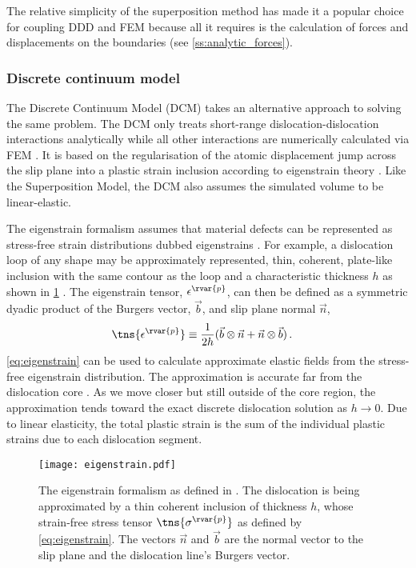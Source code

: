 The relative simplicity of the superposition method has made it a popular choice \cite{analytic_tractions, ddd_fem_sm, ddd_fem_sm2} for coupling DDD and FEM because all it requires is the calculation of forces and displacements on the boundaries (see \cref{ss:analytic_forces}).

\subsubsection{Discrete continuum model}
\label{sss:discrete_continuum}
The Discrete Continuum Model (DCM) takes an alternative approach to solving the same problem. The DCM only treats short-range dislocation-dislocation interactions analytically while all other interactions are numerically calculated via FEM \cite{dcm}. It is based on the regularisation of the atomic displacement jump across the slip plane into a plastic strain inclusion according to eigenstrain theory \cite{eigenstrain}. Like the Superposition Model, the DCM also assumes the simulated volume to be linear-elastic.

The eigenstrain formalism assumes that material defects can be represented as stress-free strain distributions dubbed eigenstrains \cite{eigenstrain}. For example, a dislocation loop of any shape may be approximately represented, thin, coherent, plate-like inclusion with the same contour as the loop and a characteristic thickness $ h $ as shown in \cref{f:eigenstrain} \cite{dcm}. The eigenstrain tensor, $ \epsilon^{\rvar{p}} $, can then be defined as a symmetric dyadic product of the Burgers vector, $ \vec{b} $, and slip plane normal $ \vec{n} $,
\begin{align}\label{eq:eigenstrain}
    \tns{\epsilon^{\rvar{p}}} & \equiv \dfrac{1}{2h} (\vec{b} \otimes \vec{n} + \vec{n} \otimes \vec{b})\,.
\end{align}
\cref{eq:eigenstrain} can be used to calculate approximate elastic fields from the stress-free eigenstrain distribution. The approximation is accurate far from the dislocation core \cite{dln_core}. As we move closer but still outside of the core region, the approximation tends toward the exact discrete dislocation solution as $ h \to 0$. Due to linear elasticity, the total plastic strain is the sum of the individual plastic strains due to each dislocation segment.
\begin{figure}
    \centering
    \texttt{[image: eigenstrain.pdf]}
    \caption[The eigenstrain formalism.]{The eigenstrain formalism as defined in \cite{eigenstrain}. The dislocation is being approximated by a thin coherent inclusion of thickness $ h $, whose strain-free stress tensor $ \tns{\sigma^{\rvar{p}}} $ as defined by \cref{eq:eigenstrain}. The vectors $ \vec{n} $ and $ \vec{b} $ are the normal vector to the slip plane and the dislocation line's Burgers vector.}
    \label{f:eigenstrain}
\end{figure}

